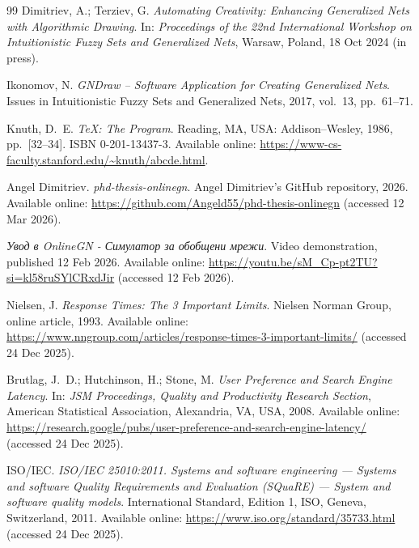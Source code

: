 \begin{thebibliography}{99}
Dimitriev, A.; Terziev, G.
\newblock \emph{Automating Creativity: Enhancing Generalized Nets with Algorithmic Drawing}.
\newblock In: \emph{Proceedings of the 22nd International Workshop on Intuitionistic Fuzzy Sets and Generalized Nets},
Warsaw, Poland, 18 Oct 2024 (in press).

Ikonomov, N.
\newblock \emph{GNDraw -- Software Application for Creating Generalized Nets}.
\newblock Issues in Intuitionistic Fuzzy Sets and Generalized Nets, 2017, vol.~13, pp.~61--71.

Knuth, D.~E.
\newblock \emph{\TeX: The Program}.
\newblock Reading, MA, USA: Addison--Wesley, 1986, pp.~[32--34].
\newblock ISBN 0-201-13437-3.
\newblock Available online: \url{https://www-cs-faculty.stanford.edu/~knuth/abcde.html}.

Angel Dimitriev.
\newblock \emph{phd-thesis-onlinegn}.
\newblock Angel Dimitriev's GitHub repository, 2026.
\newblock Available online: \url{https://github.com/Angeld55/phd-thesis-onlinegn} (accessed 12 Mar 2026).

\newblock \emph{Увод в OnlineGN - Симулатор за обобщени мрежи}.
\newblock Video demonstration, published 12 Feb 2026.
\newblock Available online: \url{https://youtu.be/sM_Cp-pt2TU?si=kl58ruSYlCRxdJir} (accessed 12 Feb 2026).

Nielsen, J.
\newblock \emph{Response Times: The 3 Important Limits}.
\newblock Nielsen Norman Group, online article, 1993.
\newblock Available online: \url{https://www.nngroup.com/articles/response-times-3-important-limits/} (accessed 24 Dec 2025).

Brutlag, J.~D.; Hutchinson, H.; Stone, M.
\newblock \emph{User Preference and Search Engine Latency}.
\newblock In: \emph{JSM Proceedings, Quality and Productivity Research Section}, American Statistical Association, Alexandria, VA, USA, 2008.
\newblock Available online: \url{https://research.google/pubs/user-preference-and-search-engine-latency/} (accessed 24 Dec 2025).

ISO/IEC.
\newblock \emph{ISO/IEC 25010:2011. Systems and software engineering --- Systems and software Quality Requirements and Evaluation (SQuaRE) --- System and software quality models}.
\newblock International Standard, Edition 1, ISO, Geneva, Switzerland, 2011.
\newblock Available online: \url{https://www.iso.org/standard/35733.html} (accessed 24 Dec 2025).


\end{thebibliography}
